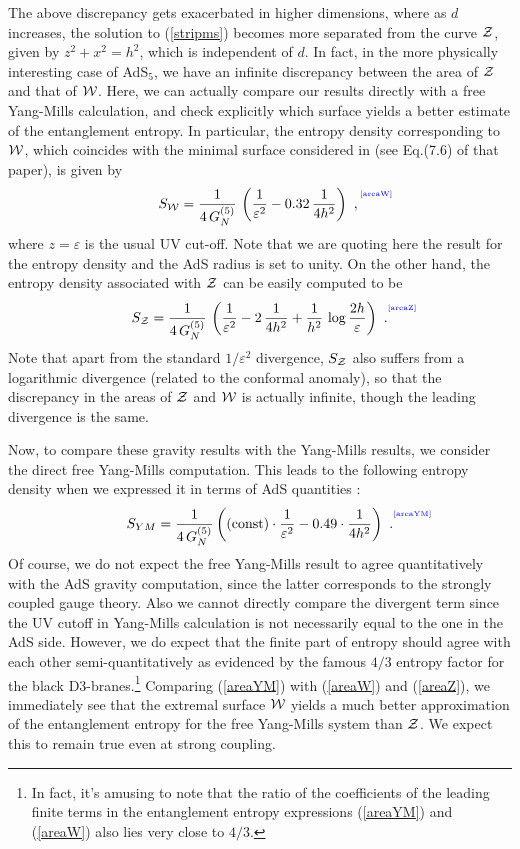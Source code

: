 \documentclass[12pt]{article}
\def\req#1{(\ref{#1})}
\def\veps{\varepsilon}
\def\CW{{\cal W}}
\def\CZ{{\cal Z}}
\def\f#1#2{{\frac{#1}{#2}}}
\def\f#1#2{{\frac{#1}{#2}}}
\def\Label#1{\label{#1}%
{ \color{blue}{\smash{\hbox to0pt{\raise2ex\hbox{\tiny[#1]}\hss}}}}}
\def\Gms{\CW}
\def\Cms{\CZ}
\def\cof{{\veps}}
\def\f {\frac}
\begin{document}
The above discrepancy gets exacerbated in higher dimensions, where
as $d$ increases, the solution to \req{stripms} becomes more
separated from the curve $\Cms$, given by
 $z^2+x^2=h^2$, which is independent of $d$.  In fact, in the more physically interesting
 case of AdS$_5$, we have an infinite discrepancy between the area of $\Cms$ and that of $\Gms$.
 Here, we can actually compare our results directly with a free Yang-Mills calculation, and check
 explicitly which surface yields a better estimate of the entanglement entropy.
In particular, the entropy density corresponding to $\Gms$, which coincides with the minimal surface
considered in \cite{Ryu:2006ef} (see Eq.(7.6) of that paper), is given by
%
\begin{equation}
S_{\Gms}=\f{1}{4\,G^{(5)}_N}\, \left(\f{1}{\cof^2}-0.32\,\f{1}{4h^2}\right) \ ,
\Label{areaW}
\end{equation}
%
where $z=\cof$ is the usual UV cut-off. Note that we are quoting here the result for the entropy density and the AdS radius is set to unity.
On the other hand, the entropy density associated with $\Cms$ can be easily computed to be
%
\begin{equation}
S_{\Cms}=
\f{1}{4\, G^{(5)}_N}\, \left(\f{1}{\cof^2}-2\, \f{1}{4h^2}+\f{1}{h^2}\,
\log\f{2h}{\cof}\right) \ .
\Label{areaZ}
\end{equation}
%
Note that apart from the standard $1/\cof^2$ divergence, $S_{\Cms}$ also suffers from a
 logarithmic divergence (related to the conformal anomaly),
 so that the discrepancy in the areas of $\Cms$ and $\Gms$ is actually
 infinite, though the leading divergence is the same.

Now, to compare these gravity results with the Yang-Mills results,
we consider the direct free Yang-Mills computation.  This leads to
the following entropy density when we expressed it in terms of AdS
quantities \cite{Ryu:2006ef}:
%
\begin{equation}
S_{YM}=\f{1}{4\, G^{(5)}_N}\left(({\rm const})\cdot\f{1}{\cof^2}-0.49\cdot\f{1}{4h^2}\right) \ .
\Label{areaYM}
\end{equation}
%
Of course, we do not expect the free Yang-Mills result to agree
quantitatively with the AdS gravity computation, since the latter
corresponds to the strongly coupled gauge theory. Also we cannot
directly compare the divergent term since the UV cutoff in
Yang-Mills calculation is not necessarily equal to the one in the
AdS side. However, we do expect that the finite part of entropy
should agree with each other semi-quantitatively as evidenced by the
famous $4/3$ entropy factor for the black D3-branes.\footnote{ In
fact, it's amusing to note that the ratio of the coefficients of the
leading finite terms in the entanglement entropy expressions
\req{areaYM} and \req{areaW} also lies very close to $4/3$. }
Comparing \req{areaYM} with \req{areaW} and \req{areaZ}, we
immediately see that the extremal surface $\Gms$ yields a much
better approximation of the entanglement entropy for the free
Yang-Mills system than $\Cms$.  We expect this to remain true even
at strong coupling.
\end{document}
